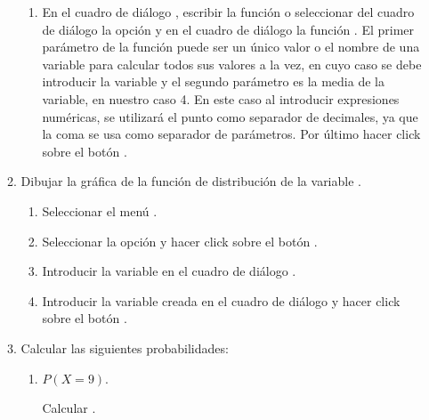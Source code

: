 \begin{enumerate}[leftmargin=*]
\begin{enumerate}
\begin{indicacion}
\begin{enumerate}
\item En el cuadro de diálogo ,
escribir la función  o seleccionar del cuadro 
de diálogo  la opción  y en el 
cuadro de diálogo  la 
función . El primer parámetro de la función 
 puede ser
un único valor o el nombre de una variable para calcular todos sus
valores a la vez, en cuyo caso se debe introducir la variable  
y el segundo parámetro es la media de la variable, en nuestro caso 4.
En este caso al introducir expresiones numéricas, se utilizará el punto 
como separador de decimales, ya que la coma se usa como separador de
parámetros. Por último hacer click sobre el botón
.
\end{enumerate}
\end{indicacion}


\item Dibujar la gráfica de la función de distribución de la variable .

\begin{indicacion}
\begin{enumerate}

\item Seleccionar el menú .


\item Seleccionar la opción  y hacer click sobre el
botón .

\item Introducir la variable  en el cuadro de diálogo
.

\item Introducir la variable creada  en el
cuadro de diálogo  y hacer click sobre el botón
.

\end{enumerate}
\end{indicacion}



\item Calcular las siguientes probabilidades:

\begin{enumerate}
\item $P(X=9)$.

\begin{indicacion}
Calcular .
\end{indicacion}


\end{enumerate}
\end{enumerate}
\end{enumerate}
